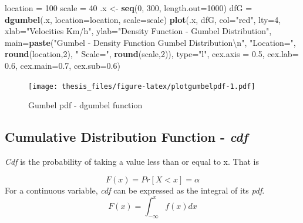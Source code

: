 \documentclass[12pt,oneside]{reedthesis}
\newenvironment{Shaded}{\begin{snugshade}}{\end{snugshade}}
\newcommand{\CharTok}[1]{\textcolor[rgb]{0.31,0.60,0.02}{#1}}
\newcommand{\DataTypeTok}[1]{\textcolor[rgb]{0.13,0.29,0.53}{#1}}
\newcommand{\DecValTok}[1]{\textcolor[rgb]{0.00,0.00,0.81}{#1}}
\newcommand{\FloatTok}[1]{\textcolor[rgb]{0.00,0.00,0.81}{#1}}
\newcommand{\KeywordTok}[1]{\textcolor[rgb]{0.13,0.29,0.53}{\textbf{#1}}}
\newcommand{\NormalTok}[1]{#1}
\newcommand{\StringTok}[1]{\textcolor[rgb]{0.31,0.60,0.02}{#1}}
\begin{document}
\footnotesize
\begin{Shaded}
\begin{Highlighting}[]
\NormalTok{location =}\StringTok{ }\DecValTok{100}
\NormalTok{scale =}\StringTok{ }\DecValTok{40}
\NormalTok{.x <-}\StringTok{ }\KeywordTok{seq}\NormalTok{(}\DecValTok{0}\NormalTok{, }\DecValTok{300}\NormalTok{, }\DataTypeTok{length.out=}\DecValTok{1000}\NormalTok{)}
\NormalTok{dfG =}\StringTok{ }\KeywordTok{dgumbel}\NormalTok{(.x, }\DataTypeTok{location=}\NormalTok{location, }\DataTypeTok{scale=}\NormalTok{scale)}
\KeywordTok{plot}\NormalTok{(.x, dfG, }\DataTypeTok{col=}\StringTok{"red"}\NormalTok{, }\DataTypeTok{lty=}\DecValTok{4}\NormalTok{, }
     \DataTypeTok{xlab=}\StringTok{"Velocities Km/h"}\NormalTok{, }\DataTypeTok{ylab=}\StringTok{"Density Function - Gumbel Distribution"}\NormalTok{, }
     \DataTypeTok{main=}\KeywordTok{paste}\NormalTok{(}\StringTok{"Gumbel - Density Function Gumbel Distribution}\CharTok{\textbackslash{}n}\StringTok{"}\NormalTok{, }\StringTok{"Location="}\NormalTok{, }
     \KeywordTok{round}\NormalTok{(location,}\DecValTok{2}\NormalTok{), }\StringTok{" Scale="}\NormalTok{, }\KeywordTok{round}\NormalTok{(scale,}\DecValTok{2}\NormalTok{)), }\DataTypeTok{type=}\StringTok{"l"}\NormalTok{, }
     \DataTypeTok{cex.axis =} \FloatTok{0.5}\NormalTok{, }\DataTypeTok{cex.lab=} \FloatTok{0.6}\NormalTok{, }\DataTypeTok{cex.main=}\FloatTok{0.7}\NormalTok{, }\DataTypeTok{cex.sub=}\FloatTok{0.6}\NormalTok{)}
\end{Highlighting}
\end{Shaded}
\begin{figure}
\centering
\texttt{[image: thesis\_files/figure-latex/plotgumbelpdf-1.pdf]}
\caption{\label{fig:plotgumbelpdf}Gumbel pdf - dgumbel function}
\end{figure}
\normalsize

\hypertarget{cumulative-distribution-function---cdf}{%
\subsection{\texorpdfstring{Cumulative Distribution Function - \emph{cdf}}{Cumulative Distribution Function - cdf}}\label{cumulative-distribution-function---cdf}}

\emph{Cdf} is the probability of taking a value less than or equal to x. That is

\[
F(x) = Pr[X < x] = \alpha
\]
For a continuous variable, \emph{cdf} can be expressed as the integral of its \emph{pdf}.
\[
F(x) = \int_{-\infty}^x f(x)dx
\]
\end{document}

